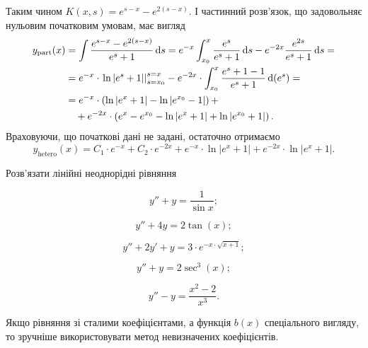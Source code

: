 \begin{solution}
	Таким чином $K(x, s) = e^{s - x} - e^{2(s - x)}$. І частинний роз\-в'яз\-ок, що задовольняє нульовим початковим умовам, має вигляд
	\begin{align*}
		y_{\text{part}}(x) &= \int \frac{e^{s - x} - e^{2(s - x)}}{e^s + 1} \mathop{}\!\mathrm{d} s = e^{-x} \int_{x_0}^x \frac{e^s}{e^s + 1} \mathop{}\!\mathrm{d} s - e^{-2x} \frac{e^{2 s}}{e^s + 1} \mathop{}\!\mathrm{d} s = \\ &= e^{-x} \cdot \left. \ln |e^s + 1| \right|_{s = x_0}^{s = x} - e^{-2x} \cdot \int_{x_0}^x \frac{e^s + 1 - 1}{e^s + 1} \mathop{}\!\mathrm{d} (e^s) = \\ &= e^{-x} \cdot \left( \ln |e^x + 1| - \ln |e^{x_0} - 1| \right) + \\ & \quad + e^{-2x} \cdot \left( e^x - e^{x_0} - \ln |e^x + 1| + \ln |e^{x_0} + 1| \right).
	\end{align*}
	Враховуючи, що початкові дані не задані, остаточно отримаємо
	\begin{equation*}
		y_{\text{hetero}}(x) = C_1 \cdot e^{-x} + C_2 \cdot e^{-2x} + e^{-x} \cdot \ln |e^x + 1| + e^{-2x} \cdot \ln |e^x + 1|.
	\end{equation*}
\end{solution}

Розв'язати лінійні неоднорідні рівняння
\begin{multicols}{2}
\begin{problem}
	\[y'' + y = \frac{1}{\sin x};\]
\end{problem}
\begin{problem}
	\[y'' + 4 y = 2 \tan (x);\]
\end{problem}
\begin{problem}
	\[y'' + 2 y' + y = 3 \cdot e^{-x \cdot \sqrt{x + 1}};\]
\end{problem}
\begin{problem}
	\[y'' + y = 2 \sec^3(x);\]
\end{problem}
\begin{problem}
	\[y'' - y= \frac{x^2 - 2}{x^3}.\]
\end{problem}
\end{multicols}

Якщо рівняння зі сталими коефіцієнтами, а функція $b(x)$ спеціального вигляду, то зручніше використовувати метод невизначених коефіцієнтів.

